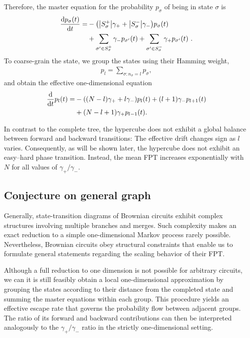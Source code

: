 \documentclass[%
 reprint,
superscriptaddress,
 amsmath,amssymb,
 aps,
 prx,
]{revtex4-2}
\begin{document}
Therefore, the master equation for the probability $p_\sigma$ of being in state $\sigma$ is  
\begin{align}
    \dv{p_\sigma(t)}{t} = & - \qty(\abs{S_\sigma^+} \gamma_+ + \abs{S_\sigma^-} \gamma_-) p_\sigma(t) \notag \\
    & + \sum_{\sigma' \in S_\sigma^+} \gamma_- p_{\sigma'}(t) + \sum_{\sigma' \in S_\sigma^-} \gamma_+ p_{\sigma'}(t) \ .
\end{align}
To coarse-grain the state, we group the states using their Hamming weight, 
\begin{align*}
    p_l = \sum_{\sigma: n_\sigma=l}p_\sigma, 
\end{align*}
and obtain the effective one-dimensional equation
\begin{align}
    \dv{t} p_l(t) = & - \qty((N-l)\gamma_+ + l \gamma_-) p_l(t) + (l+1) \gamma_- p_{l+1}(t) \notag \\
    & + (N - l+1) \gamma_+ p_{l-1}(t). 
\end{align}

In contrast to the complete tree, the hypercube does not exhibit a global balance between forward and backward transitions: The effective drift changes sign as $l$ varies. Consequently, as will be shown later, the hypercube does not exhibit an easy--hard phase transition. Instead, the mean FPT increases exponentially with $N$ for all values of $\gamma_+/\gamma_-$. 

\subsection{Conjecture on general graph}\label{Conjecture on general graph}

Generally, state-transition diagrams of Brownian circuits exhibit complex structures involving multiple branches and merges. Such complexity makes an exact reduction to a simple one-dimensional Markov process rarely possible. 
Nevertheless, Brownian circuits obey structural constraints that enable us to formulate general statements regarding the scaling behavior of their FPT.  

Although a full reduction to one dimension is not possible for arbitrary circuits, we can it is still feasibly obtain a local one-dimensional approximation by grouping the states according to their distance from the completed state and summing the master equations within each group. This procedure yields an effective escape rate that governs the probability flow between adjacent groups. The ratio of its forward and backward contributions can then be interpreted analogously to the $\gamma_+/\gamma_-$ ratio in the strictly one-dimensional setting. 
\end{document}
